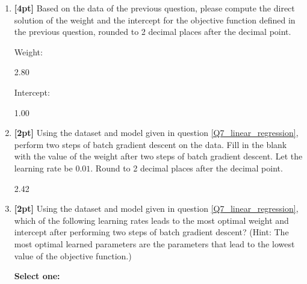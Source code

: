 \begin{enumerate}
    
    
    \item \textbf{[4pt]} Based on the data of the previous question, please compute the direct solution of the weight and the intercept for the objective function defined in the previous question, rounded to 2 decimal places after the decimal point.
    
    Weight: \quad
    \begin{tcolorbox}[fit,height=1cm, width=4cm, blank, borderline={1pt}{-2pt},nobeforeafter]
    \begin{center}\huge2.80\end{center}
    \end{tcolorbox}
    
    
    Intercept: \quad
    \begin{tcolorbox}[fit,height=1cm, width=4cm, blank, borderline={1pt}{-2pt},nobeforeafter]
    \begin{center}\huge1.00\end{center}
    \end{tcolorbox}
    
    
    
    \newpage
    \item \textbf{[2pt]} Using the dataset and model given in question \ref{Q7_linear_regression}, perform two steps of batch gradient descent on the data. Fill in the blank with the value of the weight after two steps of batch gradient descent. Let the learning rate be $0.01$. Round to 2 decimal places after the decimal point.
    
    \begin{tcolorbox}[fit,height=1cm, width=4cm, blank, borderline={1pt}{-2pt},nobeforeafter]
    \begin{center}\huge2.42\end{center}
    \end{tcolorbox}
    
    
    
    \item \textbf{[2pt]} Using the dataset and model given in question \ref{Q7_linear_regression}, which of the following learning rates leads to the most optimal weight and intercept after performing two steps of batch gradient descent? (Hint: The most optimal learned parameters are the parameters that lead to the lowest value of the objective function.)
    
    \textbf{Select one:}
    
    
    

    \clearpage
\end{enumerate}



